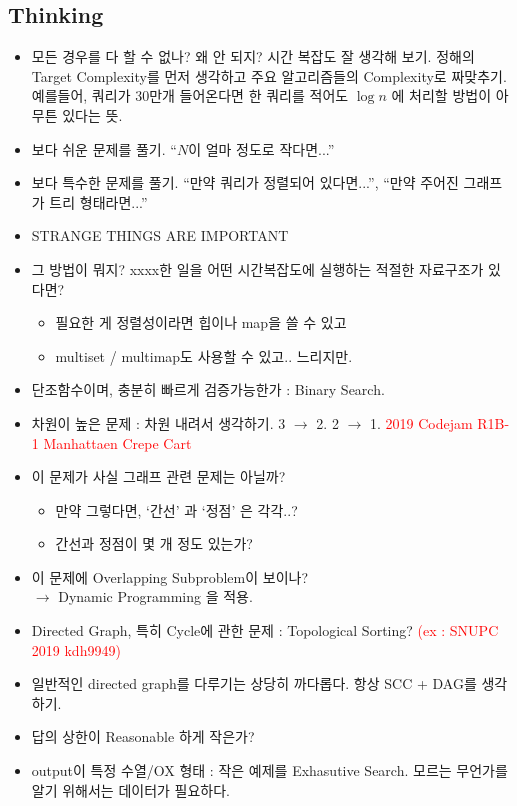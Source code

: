 \documentclass[9pt, a4paper, notitlepage]{extreport}
\begin{document}
\begin{multicols*}{2}
	\section{Thinking}
	\begin{itemize}
		\item 모든 경우를 다 할 수 없나? 왜 안 되지? 시간 복잡도 잘 생각해 보기. 정해의 Target Complexity를 먼저 생각하고 주요 알고리즘들의 Complexity로 짜맞추기.\\
		예를들어, 쿼리가 30만개 들어온다면 한 쿼리를 적어도 $\log{n}$ 에 처리할 방법이 아무튼 있다는 뜻.
        \item 보다 쉬운 문제를 풀기. ``$N$이 얼마 정도로 작다면...''
        \item 보다 특수한 문제를 풀기. ``만약 쿼리가 정렬되어 있다면...'', ``만약 주어진 그래프가 트리 형태라면...''
        \item STRANGE THINGS ARE IMPORTANT
		\item 그 방법이 뭐지? xxxx한 일을 어떤 시간복잡도에 실행하는 적절한 자료구조가 있다면?
		\begin{itemize}
			\item 필요한 게 정렬성이라면 힙이나 map을 쓸 수 있고
			\item multiset / multimap도 사용할 수 있고.. 느리지만.
		\end{itemize}
		\item 단조함수이며, 충분히 빠르게 검증가능한가 : Binary Search.
		\item 차원이 높은 문제 : 차원 내려서 생각하기. 3 $\rightarrow$ 2. 2 $\rightarrow$ 1. \textcolor{red}{2019 Codejam R1B-1 Manhattaen Crepe Cart}
		\item 이 문제가 사실 그래프 관련 문제는 아닐까?
			\begin{itemize}
				\item 만약 그렇다면, `간선' 과 `정점' 은 각각..?
				\item 간선과 정점이 몇 개 정도 있는가?
			\end{itemize}
		\item 이 문제에 Overlapping Subproblem이 보이나? \\$\rightarrow$ Dynamic Programming 을 적용.
		\item Directed Graph, 특히 Cycle에 관한 문제 : Topological Sorting? \textcolor{red}{(ex : SNUPC 2019 kdh9949)}
		\item 일반적인 directed graph를 다루기는 상당히 까다롭다. 항상 SCC + DAG를 생각하기. 
		\item 답의 상한이 Reasonable 하게 작은가? 
		\item output이 특정 수열/OX 형태 : 작은 예제를 Exhasutive Search. 모르는 무언가를 알기 위해서는 데이터가 필요하다.

\end{itemize}
\end{multicols*}
\end{document}
